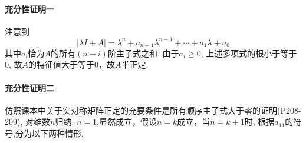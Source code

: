 \paragraph{充分性证明一}
注意到
\begin{equation}
\nonumber
|\lambda I + A| = \lambda^n + a_{n-1}\lambda^{n-1}+
\cdots + a_1 \lambda + a_0
\end{equation}
其中$a_i$恰为$A$的所有$(n-i)$阶主子式之和.
由于$a_i \ge 0$, 上述多项式的根小于等于0,
故$A$的特征值大于等于0，故$A$半正定.

\paragraph{充分性证明二}
仿照课本中关于实对称矩阵正定的充要条件是所有顺序主子式大于零的证明(P208-209),
对维数$n$归纳. $n=1$,显然成立，假设$n=k$成立，当$n=k+1$时,
根据$a_{11}$的符号,分为以下两种情形,

